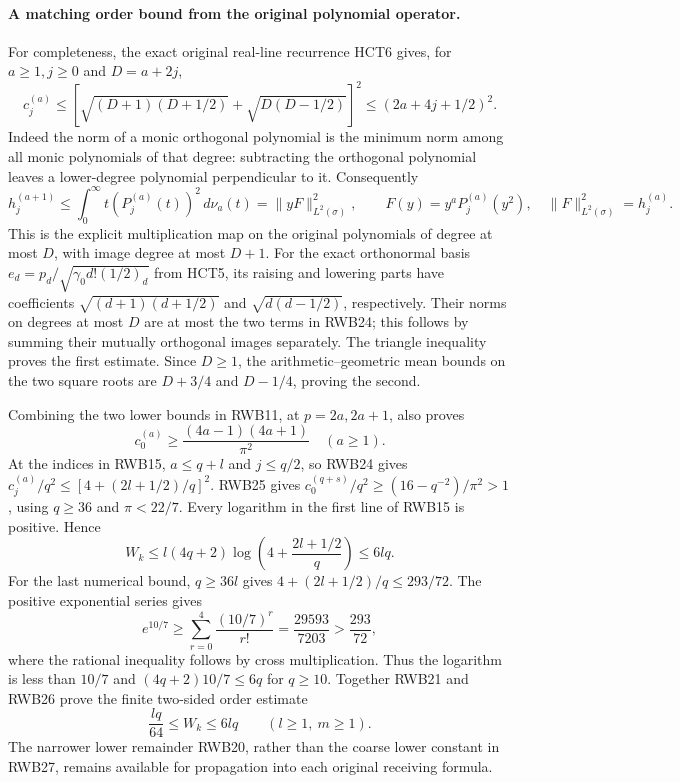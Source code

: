 \paragraph{A matching order bound from the original polynomial operator.}
For completeness, the exact original real-line recurrence HCT6 gives,
for $a\ge1,j\ge0$ and $D=a+2j$,
\[
 c_j^{(a)}\le
 \left[\sqrt{(D+1)(D+1/2)}+\sqrt{D(D-1/2)}\right]^2
 \le(2a+4j+1/2)^2.
 \tag{RWB24}
\]
Indeed the norm of a monic orthogonal polynomial is the minimum norm
among all monic polynomials of that degree: subtracting the orthogonal
polynomial leaves a lower-degree polynomial perpendicular to it.
Consequently
\[
 h_j^{(a+1)}\le\int_0^\infty
                  t(P_j^{(a)}(t))^2\,d\nu_a(t)
 =\|yF\|_{L^2(\sigma)}^2,\qquad
 F(y)=y^aP_j^{(a)}(y^2),\quad
 \|F\|_{L^2(\sigma)}^2=h_j^{(a)}.
\]
This is the explicit multiplication map on the original polynomials of
degree at most $D$, with image degree at most $D+1$.
For the exact orthonormal basis $e_d=p_d/\sqrt{\gamma_0d!(1/2)_d}$
from HCT5, its raising and lowering parts have coefficients
$\sqrt{(d+1)(d+1/2)}$ and $\sqrt{d(d-1/2)}$, respectively.
Their norms on degrees at most $D$ are at most the two terms in
RWB24; this follows by summing their mutually orthogonal images
separately. The triangle inequality proves the first estimate.
Since $D\ge1$, the arithmetic--geometric mean bounds on the two
square roots are $D+3/4$ and $D-1/4$, proving the second.

Combining the two lower bounds in RWB11, at $p=2a,2a+1$, also proves
\[
 c_0^{(a)}\ge\frac{(4a-1)(4a+1)}{\pi^2}\quad(a\ge1).
 \tag{RWB25}
\]
At the indices in RWB15, $a\le q+l$ and $j\le q/2$, so RWB24 gives
$c_j^{(a)}/q^2\le[4+(2l+1/2)/q]^2$. RWB25 gives
$c_0^{(q+s)}/q^2\ge(16-q^{-2})/\pi^2>1$, using $q\ge36$
and $\pi<22/7$. Every logarithm in the first line of RWB15 is
positive. Hence
\[
 W_k\le l(4q+2)\log\left(4+\frac{2l+1/2}{q}\right)
 \le6lq.
 \tag{RWB26}
\]
For the last numerical bound, $q\ge36l$ gives
$4+(2l+1/2)/q\le293/72$.
The positive exponential series gives
\[
 e^{10/7}\ge\sum_{r=0}^4\frac{(10/7)^r}{r!}
 =\frac{29593}{7203}>\frac{293}{72},
\]
where the rational inequality follows by cross multiplication.
Thus the logarithm is less than $10/7$ and
$(4q+2)10/7\le6q$ for $q\ge10$.
Together RWB21 and RWB26 prove the finite two-sided order estimate
\[
 \boxed{\displaystyle \frac{lq}{64}\le W_k\le6lq
 \qquad(l\ge1,\ m\ge1).}
 \tag{RWB27}
\]
The narrower lower remainder RWB20, rather than the coarse lower
constant in RWB27, remains available for propagation into each
original receiving formula.
